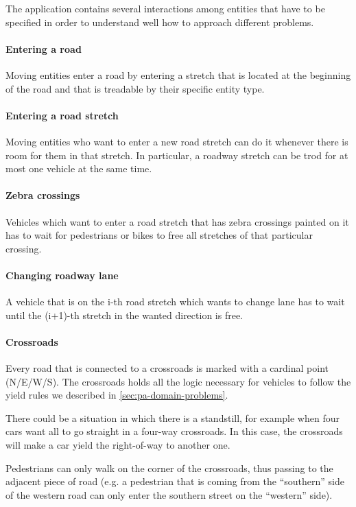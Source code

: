 
The application contains several interactions among entities that have to be
specified in order to understand well how to approach different problems.

\paragraph{Entering a road} Moving entities enter a road by entering a stretch
that is located at the beginning of the road and that is treadable by their
specific entity type.

\paragraph{Entering a road stretch} Moving entities who want to enter a new
road stretch can do it whenever there is room for them in that stretch. In
particular, a roadway stretch can be trod for at most one vehicle at the same
time.

\paragraph{Zebra crossings} Vehicles which want to enter a road stretch that
has zebra crossings painted on it has to wait for pedestrians or bikes to free
all stretches of that particular crossing.

\paragraph{Changing roadway lane} A vehicle that is on the i-th road stretch
which wants to change lane has to wait until the (i+1)-th stretch in the
wanted direction is free.

\paragraph{Crossroads} Every road that is connected to a crossroads is marked
with a cardinal point (N/E/W/S). The crossroads holds all the logic necessary
for vehicles to follow the yield rules we described in
\ref{sec:pa-domain-problems}.

There could be a situation in which there is a standstill, for example when
four cars want all to go straight in a four-way crossroads. In this case, the
crossroads will make a car yield the right-of-way to another one.

Pedestrians can only walk on the corner of the crossroads, thus passing to the
adjacent piece of road (e.g. a pedestrian that is coming from the ``southern''
side of the western road can only enter the southern street on the ``western''
side).

